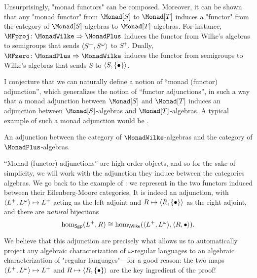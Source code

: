 Unsurprisingly, "monad functors" can be composed. Moreover, 
it can be shown that any "monad functor" from $\Monad[S]$ to $\Monad[T]$ induces
a "functor" from the category of $\Monad[S]$-algebras to $\Monad[T]$-algebras.
For instance, $\MFproj\colon \MonadWilke \Rightarrow \MonadPlus$ induces
the functor from Wilke's algebras to semigroups that sends $\tup{S^+,S^\omega}$
to $S^+$.
Dually, $\MFzero\colon \MonadPlus \Rightarrow \MonadWilke$ induces the functor
from semigroups to Wilke's algebras that sends $S$ to $\tup{S, \set{\bullet}}$.

I conjecture that we can naturally define a notion of ``monad (functor) adjunction'',
which generalizes the notion of ``functor adjunctions'',
in such a way that a monad adjunction between $\Monad[S]$ and $\Monad[T]$
induces an adjunction between $\Monad[S]$-algebras and $\Monad[T]$-algebras.
A typical example of such a monad adjunction would be
.

\begin{marginfigure}
	\centering
	\begin{tikzpicture}
		
	\end{tikzpicture}
	\caption{
		\AP\label{fig:adjunction-formal-finite-wilke}
		An adjunction between the category of
		$\MonadWilke$-algebras and the category of $\MonadPlus$-algebras.
	}
\end{marginfigure}
``Monad (functor) adjunctions'' are high-order objects, and so for the sake
of simplicity, we will work with the adjunction they induce between the categories
algebras. We go back to the example of :
we represent in  the two functors induced
between their Eilenberg-Moore categories.
It is indeed an adjunction, with $\tup{L^+, L^\omega} \mapsto L^+$ acting as the left
adjoint and $R \mapsto \tup{R,\set{\bullet}}$ as the right adjoint, and there
are \emph{natural} bijections
\[
	\textrm{hom}_{\cat{Sgp}}(L^+, R)
	\cong \textrm{hom}_{\cat{Wilke}}(\tup{L^+,L^\omega}, \tup{R,\bullet}).
\]

We believe that this adjunction are precisely what allows us to automatically project
any algebraic characterization of $\omega$-regular languages to an algebraic
characterization of "regular languages"---for a good reason: 
the two maps $\tup{L^+, L^\omega} \mapsto L^+$ and $R \mapsto \tup{R,\set{\bullet}}$
are the key ingredient of the proof!

